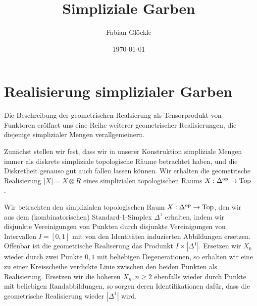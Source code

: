 



\title{Simpliziale Garben}
\author{Fabian Glöckle}
\date{\today}

\section{Realisierung simplizialer Garben}

Die Beschreibung der geometrischen Realsierung als Tensorprodukt von
Funktoren eröffnet uns eine Reihe weiterer geometrischer
Realisierungen, die diejenige simplizialer Mengen verallgemeinern.

Zunächst stellen wir fest, dass wir in unserer Konstruktion
simpliziale Mengen immer als diskrete simpliziale topologische Räume
betrachtet haben, und die Diskretheit genauso gut auch fallen lassen
können. Wir erhalten die geometrische Realisierung $|X| = X \otimes R$
eines simplizialen topologischen Raums $X: \Delta^\mathrm{op} \to \operatorname{Top}$.
\begin{bsp}
  Wir betrachten den simplizialen topologischen Raum $X: \Delta^\mathrm{op} \to
  \operatorname{Top}$, den wir aus dem (kombinatorischen) Standard-1-Simplex
  $\Delta^1$ erhalten, indem wir disjunkte Vereinigungen von Punkten
  durch disjunkte Vereinigungen von Intervallen $I = [0, 1]$ mit von
  den Identitäten induzierten Abbildungen ersetzen. Offenbar ist die
  geometrische Realiserung das Produnkt $I \times
  |\Delta^1|$. Ersetzen wir $X_0$ wieder durch zwei Punkte ${0, 1}$
  mit beliebigen Degenerationen, so erhalten wir eine zu einer
  Kreisscheibe verdickte Linie zwischen den beiden Punkten als
  Realisierung. Ersetzen wir die höheren $X_n, n \geq 2$ ebenfalls
  wieder durch Punkte mit beliebigen Randabbildungen, so sorgen deren
  Identifikationen dafür, dass die geometrische Realisierung wieder
  $|\Delta^1|$ wird.
\end{bsp}

